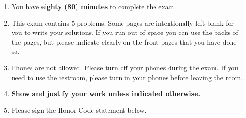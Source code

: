 \documentclass[]{exam}  %
\begin{document}
	\begin{enumerate}
		\item You have \textbf{eighty (80) minutes} to complete the exam.  
		\item This exam contains 5 problems. Some pages are intentionally left blank for you to write your solutions. If you run out of space you can use the backs of the pages, but please indicate clearly on the front pages that you have done so.
		
		
		\item Phones are not allowed. Please turn off your phones during the exam.
            If you need to use the restroom, please turn in your phones before leaving the room.
		
		\item \textbf{Show and justify your work unless indicated otherwise.}

		\item Please sign the Honor Code statement below.
	\end{enumerate}
	


    \newpage
\end{document}
